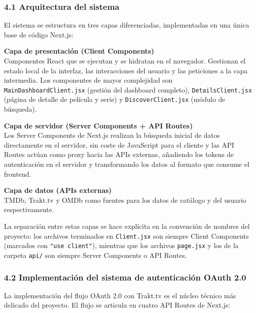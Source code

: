 \documentclass[
]{article}
\begin{document}
\hypertarget{arquitectura-del-sistema}{%
\subsubsection{4.1 Arquitectura del
sistema}\label{arquitectura-del-sistema}}

El sistema se estructura en tres capas diferenciadas, implementadas en
una única base de código Next.js:

\textbf{Capa de presentación (Client Components)}\\
Componentes React que se ejecutan y se hidratan en el navegador.
Gestionan el estado local de la interfaz, las interacciones del usuario
y las peticiones a la capa intermedia. Los componentes de mayor
complejidad son \texttt{MainDashboardClient.jsx} (gestión del dashboard
completo), \texttt{DetailsClient.jsx} (página de detalle de película y
serie) y \texttt{DiscoverClient.jsx} (módulo de búsqueda).

\textbf{Capa de servidor (Server Components + API Routes)}\\
Los Server Components de Next.js realizan la búsqueda inicial de datos
directamente en el servidor, sin coste de JavaScript para el cliente y
las API Routes actúan como proxy hacia las APIs externas, añadiendo los
tokens de autenticación en el servidor y transformando los datos al
formato que consume el frontend.

\textbf{Capa de datos (APIs externas)}\\
TMDb, Trakt.tv y OMDb como fuentes para los datos de catálogo y del
usuario respectivamente.

La separación entre estas capas se hace explícita en la convención de
nombres del proyecto: los archivos terminados en \texttt{Client.jsx} son
siempre Client Components (marcados con \texttt{"use\ client"}),
mientras que los archivos \texttt{page.jsx} y los de la carpeta
\texttt{api/} son siempre Server Components o API Routes.

\hypertarget{implementaciuxf3n-del-sistema-de-autenticaciuxf3n-oauth-2.0}{%
\subsubsection{4.2 Implementación del sistema de autenticación OAuth
2.0}\label{implementaciuxf3n-del-sistema-de-autenticaciuxf3n-oauth-2.0}}

La implementación del flujo OAuth 2.0 con Trakt.tv es el núcleo técnico
más delicado del proyecto. El flujo se articula en cuatro API Routes de
Next.js:
\end{document}
